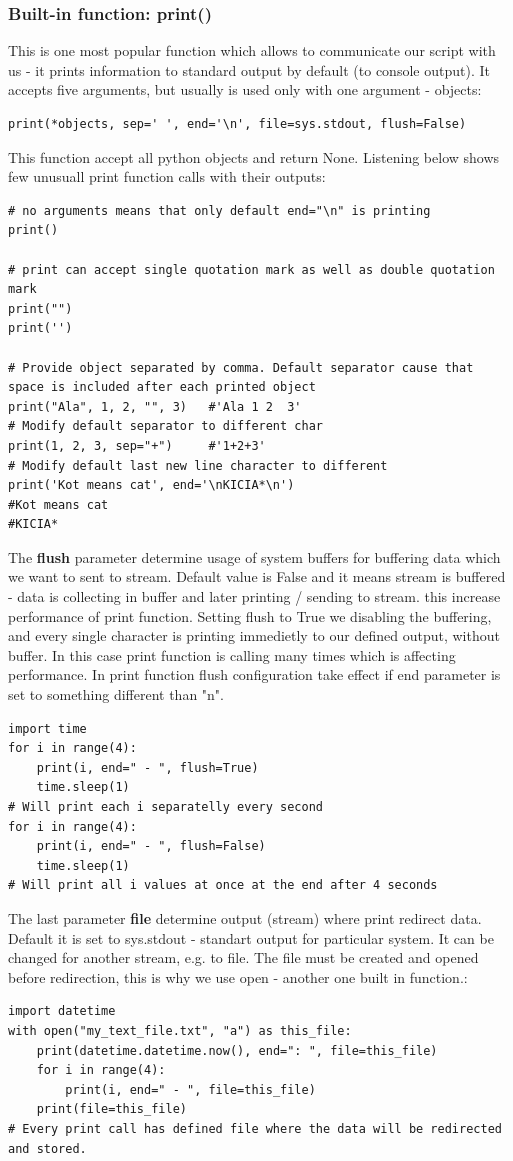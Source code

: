 \documentclass{article}
\begin{document}
	\subsubsection{Built-in function: print()}
	This is one most popular function which allows to communicate our script with us - it prints information to standard output by default (to console output). It accepts five arguments, but usually is used only with one argument - objects:
	\begin{lstlisting}[style=pystyle]
print(*objects, sep=' ', end='\n', file=sys.stdout, flush=False)
	\end{lstlisting}
	This function accept all python objects and return None.
	Listening below shows few unusuall print function calls with their outputs:
	\begin{lstlisting}[style=pystyle]
# no arguments means that only default end="\n" is printing
print()

# print can accept single quotation mark as well as double quotation mark
print("")
print('')

# Provide object separated by comma. Default separator cause that space is included after each printed object
print("Ala", 1, 2, "", 3)	#'Ala 1 2  3'
# Modify default separator to different char
print(1, 2, 3, sep="+")		#'1+2+3'
# Modify default last new line character to different 
print('Kot means cat', end='\nKICIA*\n')
#Kot means cat
#KICIA*
	\end{lstlisting}
	The \textbf{flush} parameter determine usage of system buffers for buffering data which we want to sent to stream. Default value is False and it means stream is buffered - data is collecting in buffer and later printing / sending to stream. this increase performance of print function. Setting flush to True we disabling the buffering, and every single character is printing immedietly to our defined output, without buffer. In this case print function is calling many times which is affecting performance. In print function flush configuration take effect if end parameter is set to something different than "n".
	\begin{lstlisting}[style=pystyle]
import time
for i in range(4):
    print(i, end=" - ", flush=True)
    time.sleep(1)
# Will print each i separatelly every second
for i in range(4):
    print(i, end=" - ", flush=False)
    time.sleep(1)
# Will print all i values at once at the end after 4 seconds
	\end{lstlisting}
	The last parameter \textbf{file} determine output (stream) where print redirect data. Default it is set to sys.stdout - standart output for particular system. It can be changed for another stream, e.g. to file. The file must be created and opened before redirection, this is why we use open - another one built in function.:
	\begin{lstlisting}[style=pystyle]
import datetime
with open("my_text_file.txt", "a") as this_file:
    print(datetime.datetime.now(), end=": ", file=this_file)
    for i in range(4):
        print(i, end=" - ", file=this_file)
    print(file=this_file)
# Every print call has defined file where the data will be redirected and stored. 
	\end{lstlisting}
	
\end{document}
